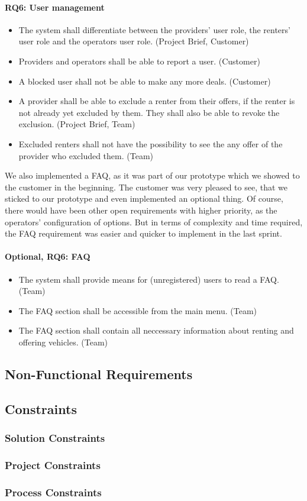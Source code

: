 \paragraph{RQ6: User management}
\begin{itemize}
    \item The system shall differentiate between the providers' user role, the renters' user role and the operators user role. (Project Brief, Customer)
    \item Providers and operators shall be able to report a user. (Customer)
    \item A blocked user shall not be able to make any more deals. (Customer)
    \item A provider shall be able to exclude a renter from their offers, if the renter is not already yet excluded by them. They shall also be able to revoke the exclusion. (Project Brief, Team)
    \item Excluded renters shall not have the possibility to see the any offer of the provider who excluded them. (Team)
\end{itemize}

We also implemented a FAQ, as it was part of our prototype which we showed to the customer in the beginning.
The customer was very pleased to see, that we sticked to our prototype and even implemented an optional thing.
Of course, there would have been other open requirements with higher priority, as the operators' configuration of options.
But in terms of complexity and time required, the FAQ requirement was easier and quicker to implement in the last sprint.

\paragraph{Optional, RQ6: FAQ}
\begin{itemize}
    \item  The system shall provide means for (unregistered) users to read a FAQ. (Team)
    \item The FAQ section shall be accessible from the main menu. (Team)
    \item The FAQ section shall contain all neccessary information about renting and offering vehicles. (Team)
\end{itemize}

\subsection{Non-Functional Requirements}
\subsection{Constraints}
\subsubsection{Solution Constraints}
\subsubsection{Project Constraints}
\subsubsection{Process Constraints}